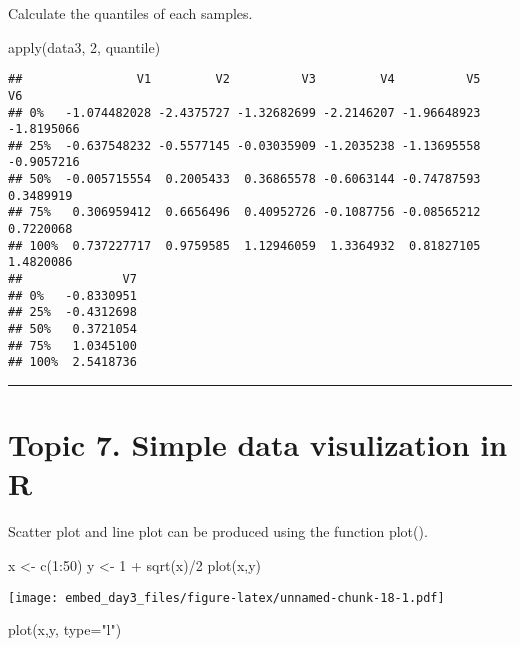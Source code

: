 \documentclass[
]{article}
\newenvironment{Shaded}{\begin{snugshade}}{\end{snugshade}}
\newcommand{\AttributeTok}[1]{\textcolor[rgb]{0.77,0.63,0.00}{#1}}
\newcommand{\DecValTok}[1]{\textcolor[rgb]{0.00,0.00,0.81}{#1}}
\newcommand{\FunctionTok}[1]{\textcolor[rgb]{0.00,0.00,0.00}{#1}}
\newcommand{\NormalTok}[1]{#1}
\newcommand{\OtherTok}[1]{\textcolor[rgb]{0.56,0.35,0.01}{#1}}
\newcommand{\SpecialCharTok}[1]{\textcolor[rgb]{0.00,0.00,0.00}{#1}}
\newcommand{\StringTok}[1]{\textcolor[rgb]{0.31,0.60,0.02}{#1}}
\begin{document}
Calculate the quantiles of each samples.

\begin{Shaded}
\begin{Highlighting}[]
\FunctionTok{apply}\NormalTok{(data3, }\DecValTok{2}\NormalTok{, quantile)}
\end{Highlighting}
\end{Shaded}

\begin{verbatim}
##                V1         V2          V3         V4          V5         V6
## 0%   -1.074482028 -2.4375727 -1.32682699 -2.2146207 -1.96648923 -1.8195066
## 25%  -0.637548232 -0.5577145 -0.03035909 -1.2035238 -1.13695558 -0.9057216
## 50%  -0.005715554  0.2005433  0.36865578 -0.6063144 -0.74787593  0.3489919
## 75%   0.306959412  0.6656496  0.40952726 -0.1087756 -0.08565212  0.7220068
## 100%  0.737227717  0.9759585  1.12946059  1.3364932  0.81827105  1.4820086
##              V7
## 0%   -0.8330951
## 25%  -0.4312698
## 50%   0.3721054
## 75%   1.0345100
## 100%  2.5418736
\end{verbatim}

\begin{center}\rule{0.5\linewidth}{0.5pt}\end{center}

\hypertarget{topic-7.-simple-data-visulization-in-r}{%
\section{Topic 7. Simple data visulization in
R}\label{topic-7.-simple-data-visulization-in-r}}

Scatter plot and line plot can be produced using the function plot().

\begin{Shaded}
\begin{Highlighting}[]
\NormalTok{x }\OtherTok{\textless{}{-}} \FunctionTok{c}\NormalTok{(}\DecValTok{1}\SpecialCharTok{:}\DecValTok{50}\NormalTok{)}
\NormalTok{y }\OtherTok{\textless{}{-}} \DecValTok{1} \SpecialCharTok{+} \FunctionTok{sqrt}\NormalTok{(x)}\SpecialCharTok{/}\DecValTok{2}
\FunctionTok{plot}\NormalTok{(x,y)}
\end{Highlighting}
\end{Shaded}

\texttt{[image: embed\_day3\_files/figure-latex/unnamed-chunk-18-1.pdf]}

\begin{Shaded}
\begin{Highlighting}[]
\FunctionTok{plot}\NormalTok{(x,y, }\AttributeTok{type=}\StringTok{"l"}\NormalTok{)}
\end{Highlighting}
\end{Shaded}
\end{document}

